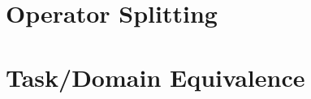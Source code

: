 \documentclass{llncs}
\begin{document}
\setcounter{tocdepth}{4}

\tableofcontents





\section{Operator Splitting}








\section{Task/Domain Equivalence}












\end{document}
